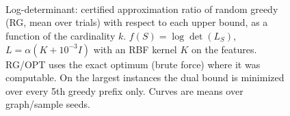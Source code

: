 \begin{figure}[t]
\centering
\setlength{\rgplotwidth}{0.49\columnwidth}
\\[1pt]
\hfill
\\
\hfill
\\

\caption{Log-determinant: certified approximation ratio of random greedy (RG, mean over trials) with respect to each upper bound, as a function of the cardinality $k$. $f(S)=\log\det(L_S)$, $L=\alpha(K+10^{-3}I)$ with an RBF kernel $K$ on the features. RG/OPT uses the exact optimum (brute force) where it was computable. On the largest instances the dual bound is minimized over every 5th greedy prefix only. Curves are means over graph/sample seeds.}
\label{fig:rg-log_det}
\end{figure}
